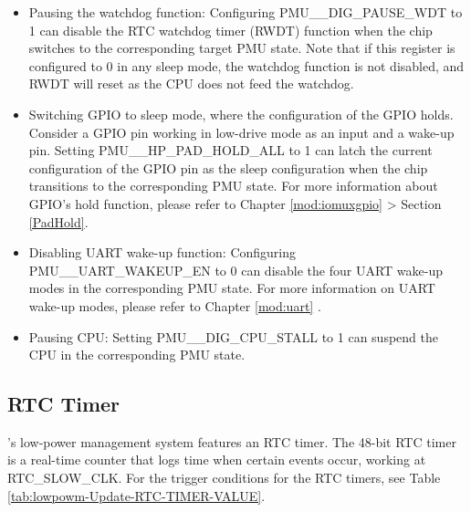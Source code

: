 \documentclass[main\_\_EN.tex]{subfiles}
\begin{document}
\begin{itemize}
    \item Pausing the watchdog function: Configuring PMU\_\_DIG\_PAUSE\_WDT to 1 can disable the RTC watchdog timer (RWDT) function when the chip switches to the corresponding target PMU state. Note that if this register is configured to 0 in any sleep mode, the watchdog function is not disabled, and RWDT will reset as the CPU does not feed the watchdog.

    \item Switching GPIO to sleep mode, where the configuration of the GPIO holds. Consider a GPIO pin working in low-drive mode as an input and a wake-up pin. Setting PMU\_\_HP\_PAD\_HOLD\_ALL to 1 can latch the current configuration of the GPIO pin as the sleep configuration when the chip transitions to the corresponding PMU state. For more information about GPIO's hold function, please refer to Chapter \ref{mod:iomuxgpio} \textit{} > Section \ref{PadHold}.

    \item Disabling UART wake-up function: Configuring PMU\_\_UART\_WAKEUP\_EN to 0 can disable the four UART wake-up modes in the corresponding PMU state. For more information on UART wake-up modes, please refer to Chapter \ref{mod:uart} \textit{}.

    \item Pausing CPU: Setting PMU\_\_DIG\_CPU\_STALL to 1 can suspend the CPU in the corresponding PMU state.
\end{itemize}

\subsection{RTC Timer}

\chipname{}'s low-power management system features an RTC timer. The 48-bit RTC timer is a real-time counter that logs time when certain events occur, working at RTC\_SLOW\_CLK. For the trigger conditions for the RTC timers, see Table \ref{tab:lowpowm-Update-RTC-TIMER-VALUE}.
\end{document}
